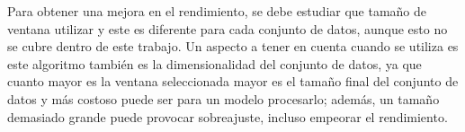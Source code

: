 Para obtener una mejora en el rendimiento, se debe estudiar que tamaño de ventana utilizar y este es diferente para cada conjunto de datos, aunque esto no se cubre dentro de este trabajo. Un aspecto a tener en cuenta cuando se utiliza es este algoritmo también es la dimensionalidad del conjunto de datos, ya que cuanto mayor es la ventana seleccionada mayor es el tamaño final del conjunto de datos y más costoso puede ser para un modelo procesarlo; además, un tamaño demasiado grande puede provocar sobreajuste, incluso empeorar el rendimiento.\newline




